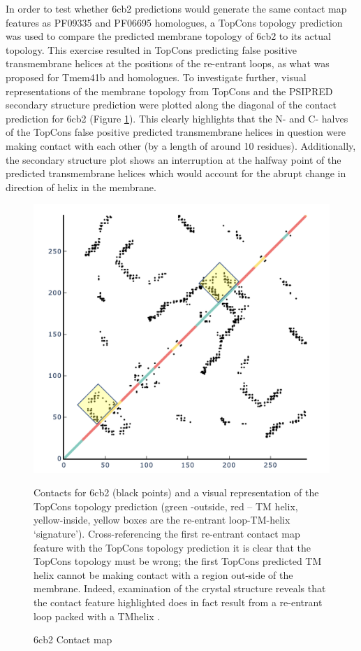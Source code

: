  In order to test whether 6cb2 predictions would generate the same contact map features as PF09335 and PF06695 homologues,  a TopCons \cite{Tsirigos2015} topology prediction was used to compare the predicted membrane topology of 6cb2 to its actual topology.  This exercise resulted in TopCons predicting false positive transmembrane helices at the positions of the re-entrant loops, as what was proposed for Tmem41b and homologues.  To investigate further, visual representations of the membrane topology from TopCons and the PSIPRED secondary structure prediction were plotted along the diagonal of the contact prediction for 6cb2 (Figure \ref{fig:6cb2_conplot}).  This clearly highlights that the N- and C- halves of the TopCons false positive predicted transmembrane helices in question were making contact with each other (by a length of around 10 residues).  Additionally, the secondary structure plot shows an interruption at the halfway point of the predicted transmembrane helices which would account for the abrupt change in direction of helix in the membrane.
 \begin{figure}[th!]
    \centering
    \includegraphics[width=\textwidth]{Results/6cb2_c_map.png}
    \caption{6cb2 Contact map}
    \label{fig:6cb2_conplot}
    \small
    Contacts for 6cb2 (black points) and a visual representation of the TopCons topology prediction (green -outside, red – TM helix, yellow-inside, yellow boxes are the re-entrant loop-TM-helix ‘signature’).  Cross-referencing the first re-entrant contact map  feature with the TopCons topology prediction it is clear that the TopCons topology must be wrong; the first TopCons predicted TM helix cannot be making contact with a region out-side of the membrane.  Indeed, examination of the crystal structure reveals that the contact feature highlighted does in fact result from a re-entrant loop packed with a TMhelix .
\end{figure}

